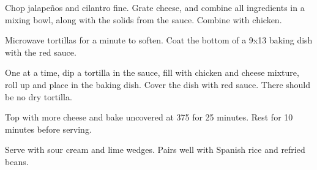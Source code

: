 \begin{recipe}
Chop jalapeños and cilantro fine. Grate cheese, and combine all ingredients in a mixing bowl, along with the solids from the sauce. Combine with chicken.


Microwave tortillas for a minute to soften. Coat the bottom of a 9x13 baking dish with the red sauce.

One at a time, dip a tortilla in the sauce, fill with chicken and cheese mixture, roll up and place in the baking dish. Cover the dish with red sauce. There should be no dry tortilla.

Top with more cheese and bake uncovered at 375\degree{} for 25 minutes. Rest for 10 minutes before serving.

Serve with sour cream and lime wedges. Pairs well with Spanish rice and refried beans.

\end{recipe}
